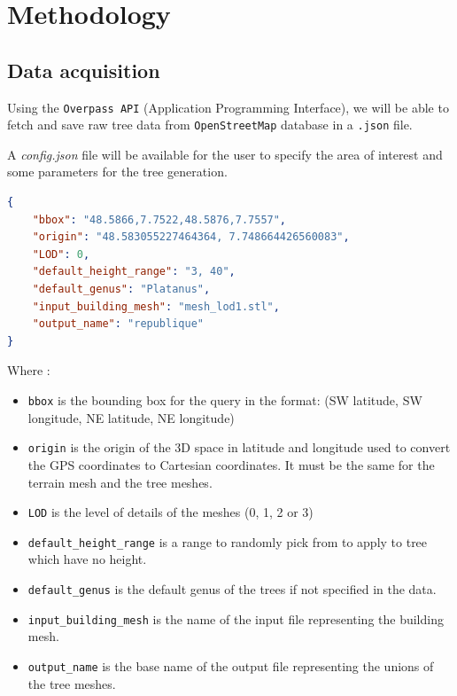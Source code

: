 \documentclass[12pt]{article}
\begin{document}
\newpage

\section{Methodology}

\subsection{Data acquisition}
Using the \texttt{Overpass API} (Application Programming Interface), we will be
able to fetch and save raw tree data from \texttt{OpenStreetMap} database
in a \texttt{.json} file.

A \textit{config.json} file will be available for the user to specify the area of
interest and some parameters for the tree generation. \\

\begin{lstlisting}[language=json]
{
    "bbox": "48.5866,7.7522,48.5876,7.7557",
    "origin": "48.583055227464364, 7.748664426560083",
    "LOD": 0,
    "default_height_range": "3, 40",
    "default_genus": "Platanus",
    "input_building_mesh": "mesh_lod1.stl",
    "output_name": "republique"
}
\end{lstlisting}

Where :
\begin{itemize}
    \item \texttt{bbox} is the bounding box for the query in the format:
    \subitem (SW latitude, SW longitude, NE latitude, NE longitude)
    \item \texttt{origin} is the origin of the 3D space in latitude and longitude
    used to convert the GPS coordinates to Cartesian coordinates. It must be the
    same for the terrain mesh and the tree meshes.
    \item \texttt{LOD} is the level of details of the meshes (0, 1, 2 or 3)
    \item \texttt{default\_height\_range} is a range to randomly pick from to apply to tree which have no height.
    \item \texttt{default\_genus} is the default genus of the trees if not specified in the data.
    \item \texttt{input\_building\_mesh} is the name of the input file representing the building mesh.
    \item \texttt{output\_name} is the base name of the output file representing the unions of the tree meshes.
\end{itemize}
\end{document}
